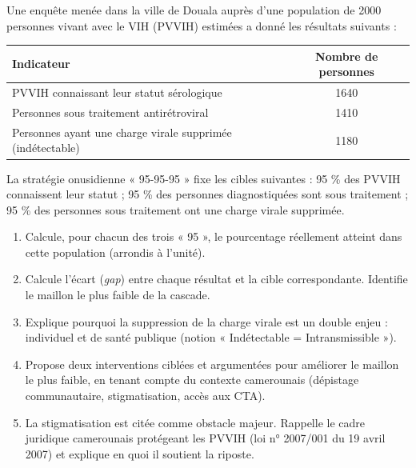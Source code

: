 \documentclass[11pt]{article}
\begin{document}
\begin{exercice}
Une enquête menée dans la ville de Douala auprès d'une population de \num{2000} personnes vivant avec le VIH (PVVIH) estimées a donné les résultats suivants :

\begin{center}
\begin{tabularx}{\linewidth}{|X|c|}\hline
\rowcolor{popblueL} Indicateur & Nombre de personnes \\ \hline
PVVIH connaissant leur statut sérologique & \num{1640} \\ \hline
Personnes sous traitement antirétroviral & \num{1410} \\ \hline
Personnes ayant une charge virale supprimée (indétectable) & \num{1180} \\ \hline
\end{tabularx}
\end{center}

La stratégie onusidienne « 95-95-95 » fixe les cibles suivantes : 95 \% des PVVIH connaissent leur statut ; 95 \% des personnes diagnostiquées sont sous traitement ; 95 \% des personnes sous traitement ont une charge virale supprimée.
\begin{enumerate}
\item Calcule, pour chacun des trois « 95 », le pourcentage réellement atteint dans cette population (arrondis à l'unité).
\item Calcule l'écart (\emph{gap}) entre chaque résultat et la cible correspondante. Identifie le maillon le plus faible de la cascade.
\item Explique pourquoi la suppression de la charge virale est un double enjeu : individuel et de santé publique (notion « Indétectable = Intransmissible »).
\item Propose deux interventions ciblées et argumentées pour améliorer le maillon le plus faible, en tenant compte du contexte camerounais (dépistage communautaire, stigmatisation, accès aux CTA).
\item La stigmatisation est citée comme obstacle majeur. Rappelle le cadre juridique camerounais protégeant les PVVIH (loi n° 2007/001 du 19 avril 2007) et explique en quoi il soutient la riposte.
\end{enumerate}
\end{exercice}
\end{document}
